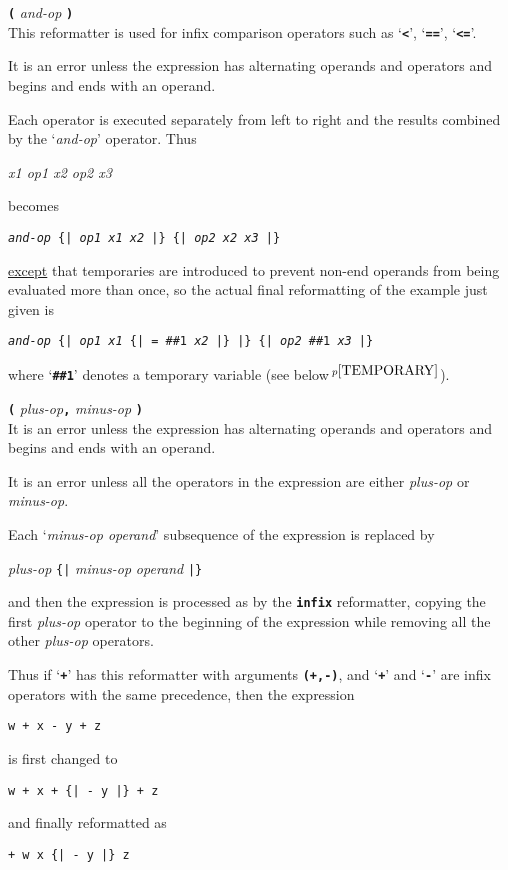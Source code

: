 \documentclass[12pt]{article}
\newcommand{\TT}[1]{{\tt \bfseries #1}}
\newcommand{\ttkey}[1]{{\tt \bfseries #1}}
\newcommand{\pagnote}[1]{$\,^{p\pageref{#1}}$}
\newenvironment{indpar}[1][0.3in]%
	{\begin{list}{}%
		     {\setlength{\itemsep}{0in}%
		      \setlength{\topsep}{0in}%
		      \setlength{\parsep}{1ex}%
		      \setlength{\labelwidth}{#1}%
		      \setlength{\leftmargin}{#1}%
		      \addtolength{\leftmargin}{\labelsep}}%
	 \item}%
	{\end{list}}
\begin{document}
\begin{indpar}[0.5in]

\hspace*{-0.3in}\ttkey{infix to} \TT{(} {\em and-op} \TT{)} \\
This reformatter is used for infix comparison operators such as
`\TT{<}', `\TT{==}', `\TT{<=}'.

It is an error unless the expression has alternating operands and operators and
begins and ends with an operand.

Each operator is executed separately from left to right and the
results combined by the `{\em and-op}' operator.  Thus
\begin{center}
\em x1 op1 x2 op2 x3
\end{center}
becomes
\begin{center}
\tt {\em and-op} \{| {\em op1} {\em x1} {\em x2} |\}
                 \{| {\em op2} {\em x2} {\em x3} |\}
\end{center}

\underline{except} that temporaries are introduced to prevent
non-end operands from being evaluated more than once, so the
actual final reformatting of the example just given is
\begin{center}
\tt {\em and-op} \{| {\em op1} {\em x1} \{| = \#\#1 {\em x2} |\} |\}
                 \{| {\em op2} \#\#1 {\em x3} |\}
\end{center}

where `\TT{\#\#1}' denotes a temporary variable
(see below\pagnote{TEMPORARY}).

\hspace*{-0.3in}\ttkey{summation}
        \TT{(} {\em plus-op}\TT{,} {\em minus-op} \TT{)} \\
It is an error unless the expression has alternating operands and operators and
begins and ends with an operand.

It is an error unless all the operators in the expression are either
{\em plus-op} or {\em minus-op}.

Each `{\em minus-op operand}' subsequence of the expression is
replaced by
\begin{center}
{\em plus-op} \verb/{|/ {\em minus-op} {\em operand} \verb/|}/
\end{center}
and then the expression is processed as by the \TT{infix} reformatter,
copying the first {\em plus-op} operator
to the beginning of the expression while
removing all the other {\em plus-op} operators.

Thus if `\TT{+}' has this reformatter with
arguments \TT{(+,-)}, and `\TT{+}' and `\TT{-}' are infix
operators with the same precedence, then the expression
\begin{center}
\tt w + x - y + z 
\end{center}
is first changed to
\begin{center}
\tt w + x + \{| - y |\} + z 
\end{center}
and finally reformatted as
\begin{center}
\tt + w x \{| - y |\} z
\end{center}


\end{indpar}
\end{document}
